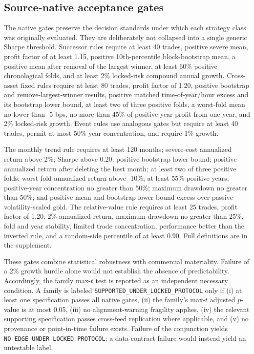 \subsection{Source-native acceptance gates}\label{subsec:native_gates}

The native gates preserve the decision standards under which each strategy class was originally evaluated. They are deliberately not collapsed into a single generic Sharpe threshold. Successor rules require at least 40 trades, positive severe mean, profit factor of at least 1.15, positive 10th-percentile block-bootstrap mean, a positive mean after removal of the largest winner, at least 60\% positive chronological folds, and at least 2\% locked-risk compound annual growth. Cross-asset fixed rules require at least 80 trades, profit factor of 1.20, positive bootstrap and remove-largest-winner results, positive matched time-of-year/hour excess and its bootstrap lower bound, at least two of three positive folds, a worst-fold mean no lower than -5 bps, no more than 45\% of positive-year profit from one year, and 2\% locked-risk growth. Event rules use analogous gates but require at least 40 trades, permit at most 50\% year concentration, and require 1\% growth.

The monthly trend rule requires at least 120 months; severe-cost annualized return above 2\%; Sharpe above 0.20; positive bootstrap lower bound; positive annualized return after deleting the best month; at least two of three positive folds; worst-fold annualized return above -10\%; at least 55\% positive years; positive-year concentration no greater than 50\%; maximum drawdown no greater than 50\%; and positive mean and bootstrap-lower-bound excess over passive volatility-scaled gold. The relative-value rule requires at least 25 trades, profit factor of 1.20, 2\% annualized return, maximum drawdown no greater than 25\%, fold and year stability, limited trade concentration, performance better than the inverted rule, and a random-side percentile of at least 0.90. Full definitions are in the supplement.

These gates combine statistical robustness with commercial materiality. Failure of a 2\% growth hurdle alone would not establish the absence of predictability. Accordingly, the family max-$t$ test is reported as an independent necessary condition. A family is labeled \texttt{SUPPORTED\_UNDER\_LOCKED\_PROTOCOL} only if (i) at least one specification passes all native gates, (ii) the family's max-$t$ adjusted $p$-value is at most 0.05, (iii) no alignment-warning fragility applies, (iv) the relevant supporting specification passes cross-feed replication where applicable, and (v) no provenance or point-in-time failure exists. Failure of the conjunction yields \texttt{NO\_EDGE\_UNDER\_LOCKED\_PROTOCOL}; a data-contract failure would instead yield an untestable label.

